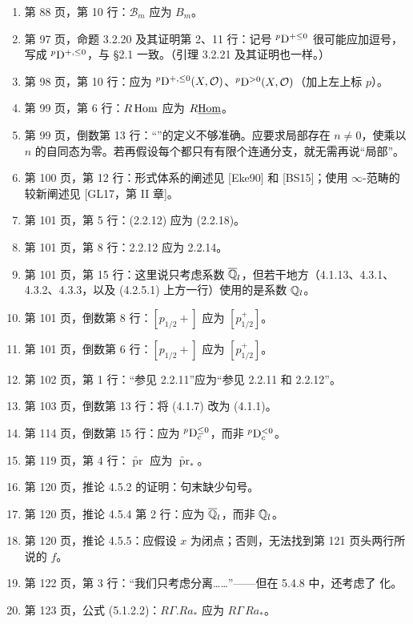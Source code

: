 \begin{enumerate}[label=\arabic*.,leftmargin=2.5em,itemsep=.65\baselineskip]
\item 第 88 页，第 10 行：$\mathcal B_m$ 应为 $B_m$。
\item 第 97 页，命题 3.2.20 及其证明第 2、11 行：记号 ${}^p\mathrm{D}^{+\le0}$ 很可能应加逗号，写成 ${}^p\mathrm{D}^{+,\le0}$，与 \S 2.1 一致。（引理 3.2.21 及其证明也一样。）
\item 第 98 页，第 10 行：应为 ${}^p\mathrm{D}^{+,\le0}(X,\mathcal O)$、${}^p\mathrm{D}^{>0}(X,\mathcal O)$（加上左上标 $p$）。
\item 第 99 页，第 6 行：$R\operatorname{Hom}$ 应为 $R\underline{\operatorname{Hom}}$。
\item 第 99 页，倒数第 13 行：“”的定义不够准确。应要求局部存在 $n\ne0$，使乘以 $n$ 的自同态为零。若再假设每个都只有有限个连通分支，就无需再说“局部”。
\item 第 100 页，第 12 行：形式体系的阐述见 [Eke90] 和 [BS15]；使用 $\infty$-范畴的较新阐述见 [GL17，第 II 章]。
\item 第 101 页，第 5 行：(2.2.12) 应为 (2.2.18)。
\item 第 101 页，第 8 行：2.2.12 应为 2.2.14。
\item 第 101 页，第 15 行：这里说只考虑系数 $\overline{\mathbb Q}_l$，但若干地方（4.1.13、4.3.1、4.3.2、4.3.3，以及 (4.2.5.1) 上方一行）使用的是系数 $\mathbb Q_l$。
\item 第 101 页，倒数第 8 行：$[p_{1/2}+]$ 应为 $[p_{1/2}^+]$。
\item 第 101 页，倒数第 6 行：$[p_{1/2}+]$ 应为 $[p_{1/2}^+]$。
\item 第 102 页，第 1 行：“参见 2.2.11”应为“参见 2.2.11 和 2.2.12”。
\item 第 103 页，倒数第 13 行：将 (4.1.7) 改为 (4.1.1)。
\item 第 114 页，倒数第 15 行：应为 ${}^p\mathrm{D}_c^{\le0}$，而非 ${}^p\mathrm{D}_c^{<0}$。
\item 第 119 页，第 4 行：$\widetilde{\operatorname{pr}}$ 应为 $\widetilde{\operatorname{pr}}_*$。
\item 第 120 页，推论 4.5.2 的证明：句末缺少句号。
\item 第 120 页，推论 4.5.4 第 2 行：应为 $\overline{\mathbb Q}_l$，而非 $\mathbb Q_l$。
\item 第 120 页，推论 4.5.5：应假设 $x$ 为闭点；否则，无法找到第 121 页头两行所说的 $f$。
\item 第 122 页，第 3 行：“我们只考虑分离……”——但在 5.4.8 中，还考虑了 化。
\item 第 123 页，公式 (5.1.2.2)：$R\Gamma.Ra_*$ 应为 $R\Gamma\,Ra_*$。

\end{enumerate}
